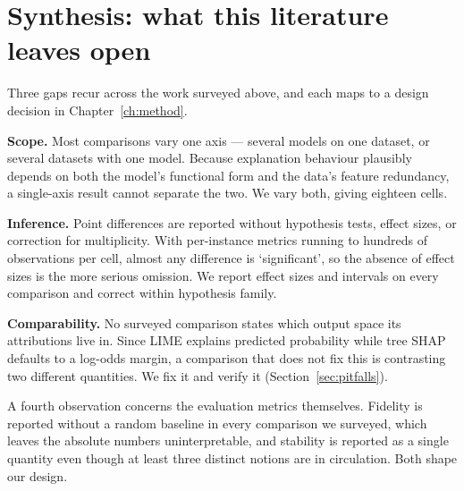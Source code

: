 \section{Synthesis: what this literature leaves open}
Three gaps recur across the work surveyed above, and each maps to a design decision in
Chapter~\ref{ch:method}.

\textbf{Scope.} Most comparisons vary one axis --- several models on one dataset, or
several datasets with one model. Because explanation behaviour plausibly depends on
both the model's functional form and the data's feature redundancy, a single-axis
result cannot separate the two. We vary both, giving eighteen cells.

\textbf{Inference.} Point differences are reported without hypothesis tests, effect
sizes, or correction for multiplicity. With per-instance metrics running to hundreds of
observations per cell, almost any difference is `significant', so the absence of effect
sizes is the more serious omission. We report effect sizes and intervals on every
comparison and correct within hypothesis family.

\textbf{Comparability.} No surveyed comparison states which output space its
attributions live in. Since LIME explains predicted probability while tree SHAP
defaults to a log-odds margin, a comparison that does not fix this is contrasting two
different quantities. We fix it and verify it (Section~\ref{sec:pitfalls}).

A fourth observation concerns the evaluation metrics themselves. Fidelity is reported
without a random baseline in every comparison we surveyed, which leaves the absolute
numbers uninterpretable, and stability is reported as a single quantity even though at
least three distinct notions are in circulation. Both shape our design.
